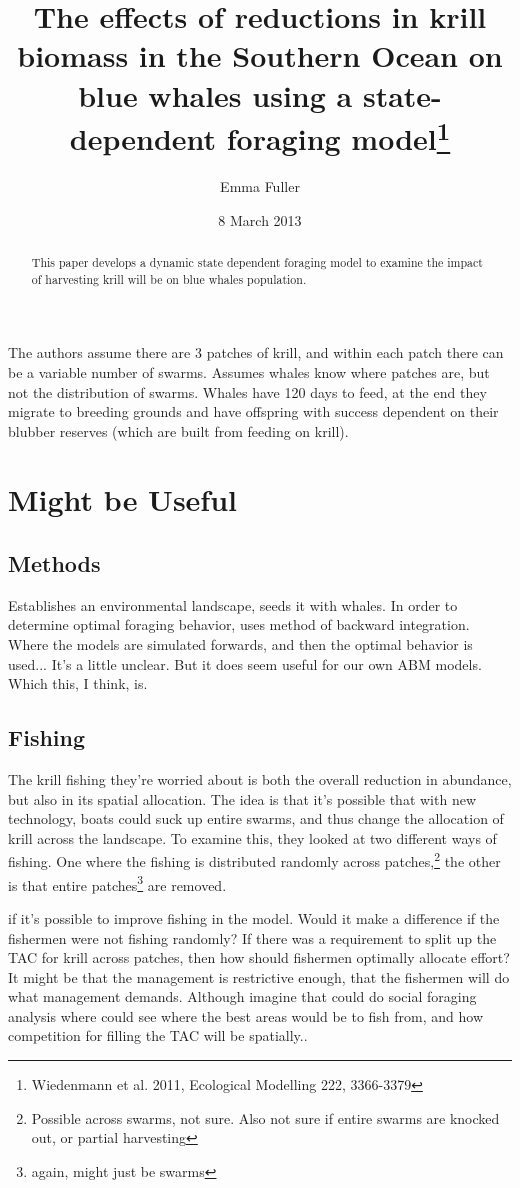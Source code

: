 \documentclass{tufte-handout}
\title{The effects of reductions in krill biomass in the Southern Ocean on blue whales using a state-dependent foraging model\thanks{Wiedenmann et al. 2011, Ecological Modelling 222, 3366-3379}}
\author{Emma Fuller}
\date{8 March 2013}  %
\begin{document}
\maketitle%

\begin{abstract}
\noindent This paper develops a dynamic state dependent foraging model to examine the impact of harvesting krill will be on blue whales population. 

\end{abstract}


The authors assume there are 3 patches of krill, and within each patch there can be a variable number of swarms. Assumes whales know where patches are, but not the distribution of swarms. Whales have 120 days to feed, at the end they migrate to breeding grounds and have offspring with success dependent on their blubber reserves (which are built from feeding on krill). 

\section{Might be Useful}\label{sec:useful}
\subsection{Methods}
Establishes an environmental landscape, seeds it with whales. In order to determine optimal foraging behavior, uses method of backward integration. Where the models are simulated forwards, and then the optimal behavior is used... It's a little unclear. But it does seem useful for our own ABM models. Which this, I think, is. 

\subsection{Fishing}
The krill fishing they're worried about is both the overall reduction in abundance, but also in its spatial allocation. The idea is that it's possible that with new technology, boats could suck up entire swarms, and thus change the allocation of krill across the landscape. To examine this, they looked at two different ways of fishing. One where the fishing is distributed randomly across patches,\footnote{Possible across swarms, not sure. Also not sure if entire swarms are knocked out, or partial harvesting} the other is that entire patches\footnote{again, might just be swarms} are removed. 

 if it's possible to improve fishing in the model. Would it make a difference if the fishermen were not fishing randomly? If there was a requirement to split up the TAC for krill across patches, then how should fishermen optimally allocate effort? It might be that the management is restrictive enough, that the fishermen will do what management demands. Although imagine that could do social foraging analysis where could see where the best areas would be to fish from, and how competition for filling the TAC will be spatially.. 

%
\end{document}
